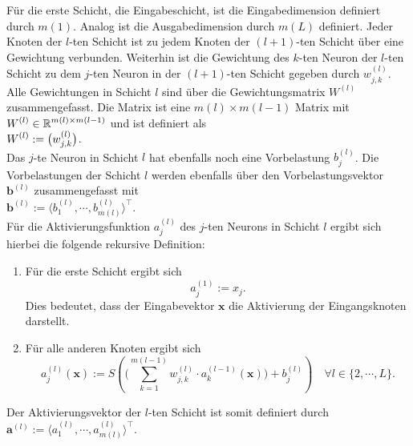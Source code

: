 \noindent
Für die erste Schicht, die Eingabeschicht, ist die Eingabedimension definiert durch $m(1)$. Analog ist die Ausgabedimension durch $m(L)$ definiert. Jeder Knoten der $l$-ten Schicht ist zu jedem Knoten der $(l+1)$-ten Schicht über eine Gewichtung verbunden. Weiterhin ist die Gewichtung des $k$-ten Neuron der $l$-ten Schicht zu dem $j$-ten Neuron in der $(l+1)$-ten Schicht gegeben durch $w_{j,k}^{(l)}$. Alle Gewichtungen in Schicht $l$ sind über die Gewichtungsmatrix $W^{(l)}$ zusammengefasst. Die Matrix ist eine $m(l) \times m(l-1)$ Matrix mit $\displaystyle W^{(l)} \in \mathbb{R}^{m(l) \times m(l-1)}$ und ist definiert als
\\[0.2cm]
\hspace*{1.3cm}
$\displaystyle W^{(l)} := \bigl( w_{j,k}^{(l)} \bigr)$.
\\[0.2cm]
Das $j$-te Neuron in Schicht $l$ hat ebenfalls noch eine Vorbelastung $b_j^{(l)}$. Die Vorbelastungen der Schicht $l$ werden ebenfalls über den Vorbelastungsvektor $\mathbf{b}^{(l)}$ zusammengefasst mit
\\[0.2cm]
\hspace*{1.3cm}
$\mathbf{b}^{(l)} := \langle b_1^{(l)}, \cdots, b_{m(l)}^{(l)} \rangle^\top$.
\\[0.2cm]
Für die Aktivierungsfunktion $a_j^{(l)}$ des $j$-ten Neurons in Schicht $l$ ergibt sich hierbei die folgende rekursive Definition:
\begin{enumerate}
\item Für die erste Schicht ergibt sich
      \begin{equation}
        \label{eq:feedforward1}
       a^{(1)}_j := x_j.
      \end{equation}
      Dies bedeutet, dass der Eingabevektor $\mathbf{x}$ die Aktivierung der Eingangsknoten darstellt.
\item Für alle anderen Knoten ergibt sich
      \begin{equation}
         \label{eq:feedforward2}
         a_j^{(l)}(\mathbf{x}) := 
             S\left(\Biggl(\sum\limits_{k=1}^{m(l-1)} w_{j,k}^{(l)}\cdot a_k^{(l-1)}(\mathbf{x})\Biggr) + b_{j}^{(l)}\right) 
        \quad \mbox{$\forall l \in \{2, \cdots, L\}$}.
\end{equation}
\end{enumerate}
Der Aktivierungsvektor der $l$-ten Schicht ist somit definiert durch
\\[0.2cm]
\hspace*{1.3cm}
$\mathbf{a}^{(l)} := \langle a_1^{(l)}, \cdots, a_{m(l)}^{(l)} \rangle^\top$.
\\[0.2cm]
